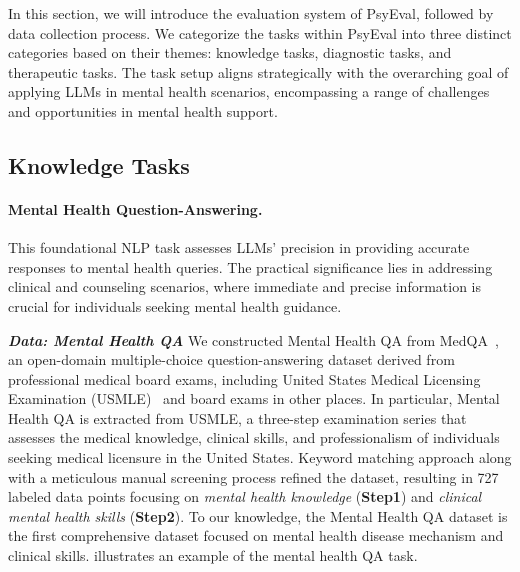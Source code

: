 In this section, we will introduce the evaluation system of PsyEval, followed by data collection process. We categorize the tasks within PsyEval into three distinct categories based on their themes: knowledge tasks, diagnostic tasks, and therapeutic tasks.
The task setup aligns strategically with the overarching goal of applying LLMs in mental health scenarios, encompassing a range of challenges and opportunities in mental health support.
\subsection{Knowledge Tasks}
\paragraph*{Mental Health Question-Answering.} This foundational NLP task assesses LLMs' precision in providing accurate responses to mental health queries. The practical significance lies in addressing clinical and counseling scenarios, where immediate and precise information is crucial for individuals seeking mental health guidance.

\textbf{\textit{Data: Mental Health QA}} 
We constructed Mental Health QA from MedQA~\cite{jin2021disease}, an open-domain multiple-choice question-answering dataset derived from professional medical board exams, including United States Medical Licensing Examination (USMLE)~\cite{usmle} and board exams in other places. In particular, Mental Health QA is extracted from USMLE, a three-step examination series that assesses the medical knowledge, clinical skills, and professionalism of individuals seeking medical licensure in the United States. Keyword matching approach along with a meticulous manual screening process refined the dataset, resulting in 727 labeled data points focusing on \textit{mental health knowledge} (\textbf{Step1}) and \textit{clinical mental health skills} (\textbf{Step2}). To our knowledge, the Mental Health QA dataset is the first comprehensive dataset focused on mental health disease mechanism and clinical skills.  illustrates an example of the mental health QA task. 

